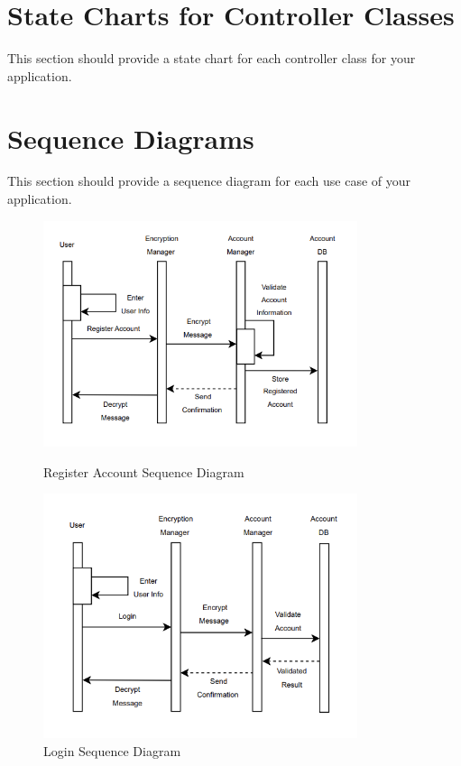\documentclass[]{article}
\begin{document}


\section{State Charts for Controller Classes}
\label{sec:state_charts_for_controller_classes}
This section should provide a state chart for each controller class for your application.

\section{Sequence Diagrams}
\label{sec:sequence_diagrams}
This section should provide a sequence diagram for each use case of your application.
\begin{figure}[h]
    \centering

    \begin{minipage}[b]{\textwidth}
        \centering
        \includegraphics[width=0.82\textwidth]{RegisterSequenceDiagram.png}
        \caption{Register Account Sequence Diagram}
        \label{fig:register}
    \end{minipage}

    \vspace{0.4cm}

    \begin{minipage}[b]{\textwidth}
        \centering
        \includegraphics[width=0.82\textwidth]{LoginSequenceDiagram.png}
        \caption{Login Sequence Diagram}
        \label{fig:login}
    \end{minipage}
\end{figure}
\end{document}
